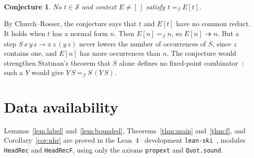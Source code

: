\documentclass[11pt]{amsart}
\newtheorem{conjecture}[theorem]{Conjecture}
\newcommand{\Ter}{\mathcal S}
\newcommand{\red}{\twoheadrightarrow}
\newcommand{\conv}{=_\beta}
\begin{document}
\begin{conjecture}
No $t\in\Ter$ and context $E\ne[\,]$ satisfy $t\conv E[t]$.
\end{conjecture}

\noindent By Church--Rosser, the conjecture says that $t$ and $E[t]$ have no common reduct. It holds
when $t$ has a normal form $n$. Then $E[n]\conv n$, so $E[n]\red n$. But a step
$S\,x\,y\,z\to x\,z\,(y\,z)$ never lowers the number of occurrences of $S$, since $z$ contains one,
and $E[n]$ has more occurrences than $n$. The conjecture would strengthen Statman's theorem that $S$ alone
defines no fixed-point combinator~\citep[Rem.~15]{dots}: such a $Y$ would give $Y\,S\conv S\,(Y\,S)$.

\section*{Data availability}
Lemmas~\ref{lem:label} and~\ref{lem:bounded}, Theorems~\ref{thm:main} and~\ref{thm:f}, and
Corollary~\ref{cor:nhr} are proved in the Lean~4~\citep{lean4} development
\texttt{lean-ski}~\citep{leanski}, modules \texttt{HeadRec} and \texttt{HeadRecF}, using only the axioms
\texttt{propext} and \texttt{Quot.sound}.



\end{document}

